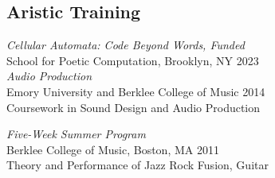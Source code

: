 \subsection{Aristic Training}
{\sl Cellular Automata: Code Beyond Words, Funded}\\
School for Poetic Computation, Brooklyn, NY\hfill
2023 \\

{\sl Audio Production}\\
Emory University and Berklee College of Music \hfill
2014 \\
Coursework in Sound Design and Audio Production


{\sl Five-Week Summer Program}\\
Berklee College of Music, Boston, MA \hfill
2011 \\
Theory and Performance of Jazz Rock Fusion, Guitar


